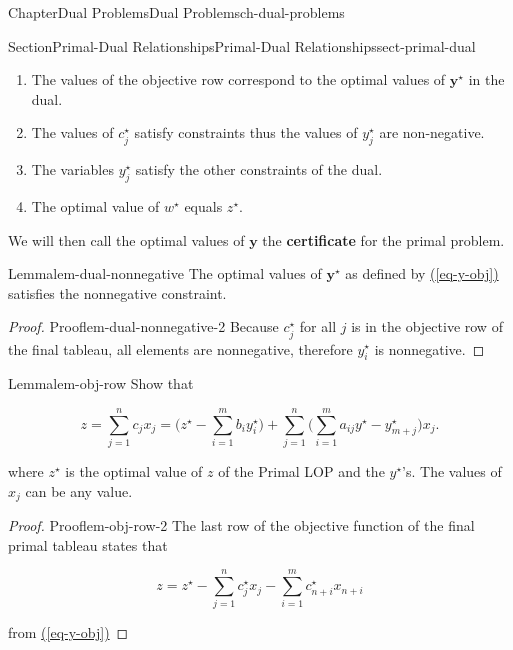 \documentclass[oneside,10pt,]{book}
\newcommand{\xreffont}{\relax}
\newcommand{\terminology}[1]{\textbf{#1}}
\numberwithin{equation}{section}
\begin{document}
\begin{chapterptx}{Chapter}{Dual Problems}{}{Dual Problems}{}{}{ch-dual-problems}
\begin{sectionptx}{Section}{Primal-Dual Relationships}{}{Primal-Dual Relationships}{}{}{sect-primal-dual}
\par
%
\begin{enumerate}
\item{}The values of the objective row correspond to the optimal values of \(\boldsymbol{y}^{\star}\) in the dual.%
\item{}The values of \(c_j^{\star}\) satisfy constraints thus the values of \(y_j^{\star}\) are non-negative.%
\item{}The variables \(y_j^{\star}\) satisfy the other constraints of the dual.%
\item{}The optimal value of \(w^{\star}\) equals \(z^{\star}\).%
\end{enumerate}
%
\par
We will then call the optimal values of \(\boldsymbol{y}\) the \terminology{certificate} for the primal problem.%
\begin{lemma}{Lemma}{}{}{lem-dual-nonnegative}%
The optimal values of \(\boldsymbol{y}^{\star}\) as defined by \hyperref[eq-y-obj]{({\xreffont\ref{eq-y-obj}})} satisfies the nonnegative constraint.%
\end{lemma}
\begin{proof}{Proof}{}{lem-dual-nonnegative-2}
Because \(c_{j}^{\star}\) for all \(j\) is in the objective row of the final tableau, all elements are nonnegative, therefore \(y_i^{\star}\) is nonnegative.%
\end{proof}
\begin{lemma}{Lemma}{}{}{lem-obj-row}%
Show that%
\par
%
\begin{equation}
z = \sum_{j=1}^n c_j x_j = \biggl(z^{\star} - \sum_{i=1}^m b_i y_i^{\star} \biggr) + \sum_{j=1}^n \biggl(\sum_{i=1}^m a_{ij} y^{\star} - y_{m+j}^{\star} \biggr) x_j.\label{eq-lemma-obj-row}
\end{equation}
%
\par
where \(z^{\star}\) is the optimal value of \(z\) of the Primal LOP and the \(y^{\star}\)'s. The values of \(x_j\) can be any value.%
\end{lemma}
\begin{proof}{Proof}{}{lem-obj-row-2}
The last row of the objective function of the final primal tableau states that%
\par
%
\begin{equation*}
z = z^{\star}- \sum_{j=1}^{n} c^{\star}_{j} x_{j} -\sum_{i=1}^{m} c^{\star}_{n+i}x_{n+i}
\end{equation*}
%
\par
from \hyperref[eq-y-obj]{({\xreffont\ref{eq-y-obj}})}%

\end{proof}
\end{sectionptx}
\end{chapterptx}
\end{document}
